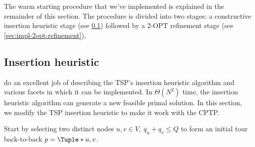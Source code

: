\medskip

The warm starting procedure that we've implemented is explained in the remainder of this section.
The procedure is divided into two stages:
a constructive insertion heuristic stage (see \cref{sec:impl-insertion-heuristic})
followed by a 2-OPT refinement stage (see \cref{sec:impl-2opt-refinement}),

\subsection{Insertion heuristic}
\label{sec:impl-insertion-heuristic}

\cite{rosenkrantz1977} do an excellent job of describing the TSP's insertion heuristic algorithm
and various facets in which it can be implemented.
In $\Theta(N^2)$ time, the insertion heuristic algorithm can generate a new feasible primal solution.
In this section,
we modify the TSP insertion heuristic
to make it work with the CPTP.

\medskip

Start by selecting two distinct nodes $u, v \in V,\ q_u + q_v \le Q$
to form an initial tour back-to-back $p = \Tuple*{u, v}$.

